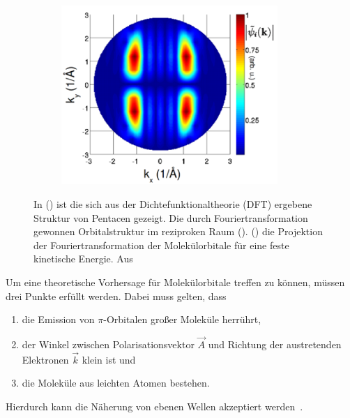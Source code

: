 \begin{figure}
\begin{subfigure}{0.3\textwidth}
                \caption{}
                \label{fig:DFT2}
            \end{subfigure}
            \begin{subfigure}{0.3\textwidth}
                \centering
                \includegraphics[width=0.9\textwidth]{DFT3.PNG}
                \caption{}
                \label{fig:DFT3}
            \end{subfigure}
            \caption{In () ist die sich aus der Dichtefunktionaltheorie (DFT) ergebene Struktur von Pentacen gezeigt.
            Die durch Fouriertransformation gewonnen Orbitalstruktur im reziproken Raum ().
            () die Projektion der Fouriertransformation der Molekülorbitale für eine feste kinetische Energie.
            Aus~\cite{MM_2}}
            \label{fig:DFT}
        \end{figure}
        Um eine theoretische Vorhersage für Molekülorbitale treffen zu können, müssen drei Punkte erfüllt werden.
        Dabei muss gelten, dass
        \begin{enumerate}
            \item die Emission von $\pi$-Orbitalen großer Moleküle herrührt,
            \item der Winkel zwischen Polarisationsvektor $\vec{A}$ und Richtung der austretenden Elektronen $\vec{k}$ klein ist und
            \item die Moleküle aus leichten Atomen bestehen.
        \end{enumerate}
        Hierdurch kann die Näherung von ebenen Wellen akzeptiert werden~\cite{MM_2}.
